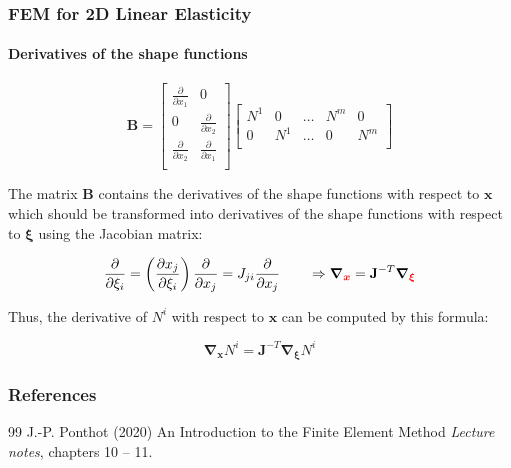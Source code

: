 \documentclass[10pt,xcolor=pdftex,dvipsnames,table]{beamer}
\begin{document}
\begin{frame}
	\frametitle{ FEM for 2D Linear Elasticity }
	\framesubtitle{ Derivatives of the shape functions }
	
	\begin{equation*}
		\mathbf{B} =
		\begin{bmatrix}
			\frac{\partial}{\partial x_1} & 0  \\
			0 &\frac{\partial}{\partial x_2}  \\
			\frac{\partial}{\partial x_2} & \frac{\partial}{\partial x_1}   \\
		\end{bmatrix}
		\begin{bmatrix}
			N^1 & 0      &  \dots & N^m & 0 \\
			0   & N^1    &  \dots & 0 & N^m  \\
		\end{bmatrix}	
	\end{equation*}

	The matrix $\mathbf{B}$ contains the derivatives of the shape functions with respect to $\boldsymbol{x}$ which should be transformed into derivatives of the shape functions with respect to $\boldsymbol{\xi}$ using the Jacobian matrix:
	
	\begin{equation*}
		\frac{\partial}{\partial\xi_i} = \left( \frac{\partial x_j}{\partial \xi_i}  \right) \frac{\partial}{\partial x_j} = J_{ji} \frac{\partial}{\partial x_j} \qquad \Rightarrow \boldsymbol{\nabla}_{\color{red}\boldsymbol{x}} = \mathbf{J}^{-T} \boldsymbol{\nabla}_{\color{red}\boldsymbol{\xi}}
	\end{equation*}	
	
		
	Thus, the derivative of $N^i$ with respect to $\boldsymbol{x}$ can be computed by this formula:
	
	\begin{equation*}
		\boldsymbol{\nabla}_{\boldsymbol{x}} N^i = \mathbf{J}^{-T} \boldsymbol{\nabla}_{\boldsymbol{\xi}} N^i
	\end{equation*}	
	
\end{frame}




\begin{frame}
	\frametitle{References}
	\footnotesize{
		\begin{thebibliography}{99} %
			 J.-P. Ponthot (2020)
			\newblock An Introduction to the Finite Element Method
			\newblock \emph{Lecture notes}, chapters 10 -- 11.
		\end{thebibliography}
	}
\end{frame}
\end{document}
